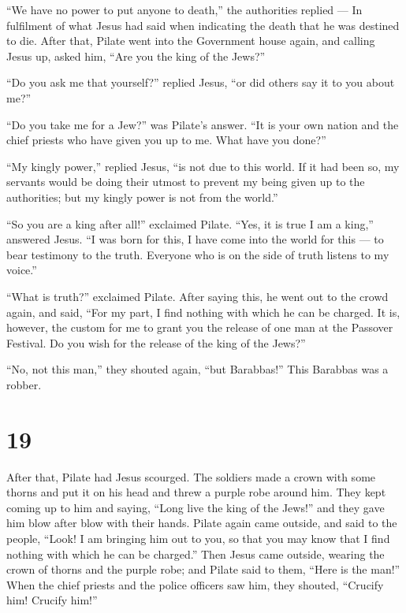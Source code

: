 ``We have no power to put anyone to death,'' the authorities replied ---
 In fulfilment of what Jesus had said when indicating the
death that he was destined to die.  After that, Pilate went
into the Government house again, and calling Jesus up, asked him, ``Are
you the king of the Jews?''

 ``Do you ask me that yourself?'' replied Jesus, ``or did
others say it to you about me?''

 ``Do you take me for a Jew?'' was Pilate's answer. ``It is
your own nation and the chief priests who have given you up to me. What
have you done?''

 ``My kingly power,'' replied Jesus, ``is not due to this
world. If it had been so, my servants would be doing their utmost to
prevent my being given up to the authorities; but my kingly power is not
from the world.''

 ``So you are a king after all!'' exclaimed Pilate. ``Yes,
it is true I am a king,'' answered Jesus. ``I was born for this, I have
come into the world for this --- to bear testimony to the truth.
Everyone who is on the side of truth listens to my voice.''

 ``What is truth?'' exclaimed Pilate. After saying this, he
went out to the crowd again, and said, ``For my part, I find nothing
with which he can be charged.  It is, however, the custom
for me to grant you the release of one man at the Passover Festival. Do
you wish for the release of the king of the Jews?''

 ``No, not this man,'' they shouted again, ``but
Barabbas!'' This Barabbas was a robber.

\hypertarget{section-18}{%
\section{19}\label{section-18}}

 After that, Pilate had Jesus scourged.  The
soldiers made a crown with some thorns and put it on his head and threw
a purple robe around him.  They kept coming up to him and
saying, ``Long live the king of the Jews!'' and they gave him blow after
blow with their hands.  Pilate again came outside, and said
to the people, ``Look! I am bringing him out to you, so that you may
know that I find nothing with which he can be charged.'' 
Then Jesus came outside, wearing the crown of thorns and the purple
robe; and Pilate said to them, ``Here is the man!''  When
the chief priests and the police officers saw him, they shouted,
``Crucify him! Crucify him!''

